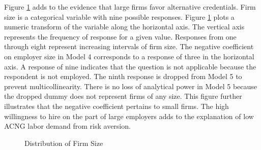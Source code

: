 \documentclass[review]{elsarticle}
\begin{document}
Figure \ref{fig:firm_size} adds to the evidence that large firms favor alternative credentials.
Firm size is a categorical variable with nine possible responses.
Figure \ref{fig:firm_size} plots a numeric transform of the variable along the horizontal axis.
The vertical axis represents the frequency of response for a given value.
Responses from one through eight represent increasing intervals of firm size.
The negative coefficient on employer size in Model 4 corresponds to a response of three in the horizontal axis.
A response of nine indicates that the question is not applicable because the respondent is not employed.
The ninth response is dropped from Model 5 to prevent multicollinearity.
There is no loss of analytical power in Model 5 because the dropped dummy does not represent firms of any size.
This figure further illustrates that the negative coefficient pertains to small firms.
The high willingness to hire on the part of large employers adds to the explanation of low ACNG labor demand from risk aversion.

\begin{figure}[h!]
    \centering
    \caption{Distribution of Firm Size}
    \label{fig:firm_size}
\end{figure}
\end{document}
